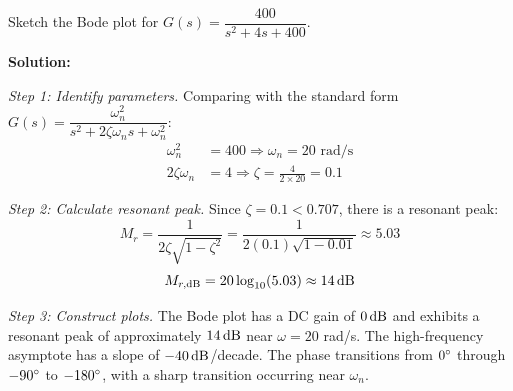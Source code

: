 \begin{example}
\begin{center}
\end{center}
\end{example}

\begin{example}
\label{ex:second_order}
Sketch the Bode plot for $G(s) = \dfrac{400}{s^2 + 4s + 400}$.

\textbf{Solution:}

\textit{Step 1: Identify parameters.}
Comparing with the standard form $G(s) = \dfrac{\omega_n^2}{s^2 + 2\zeta\omega_n s + \omega_n^2}$:
\begin{align}
\omega_n^2 &= 400 \Rightarrow \omega_n = 20 \text{ rad/s} \\
2\zeta\omega_n &= 4 \Rightarrow \zeta = \frac{4}{2 \times 20} = 0.1
\end{align}

\textit{Step 2: Calculate resonant peak.}
Since $\zeta = 0.1 < 0.707$, there is a resonant peak:
\begin{equation}
M_r = \frac{1}{2\zeta\sqrt{1-\zeta^2}} = \frac{1}{2(0.1)\sqrt{1-0.01}} \approx 5.03
\end{equation}
\begin{equation}
M_{r,\text{dB}} = 20\log_{10}(5.03) \approx 14\,\text{dB}
\end{equation}

\textit{Step 3: Construct plots.}
The Bode plot has a DC gain of $0\,\text{dB}$ and exhibits a resonant peak of approximately $14\,\text{dB}$ near $\omega = 20$ rad/s. The high-frequency asymptote has a slope of $-40\,\text{dB}$/decade. The phase transitions from $0^\circ$ through $-90^\circ$ to $-180^\circ$, with a sharp transition occurring near $\omega_n$.

\begin{center}


\end{center}
\end{example}
